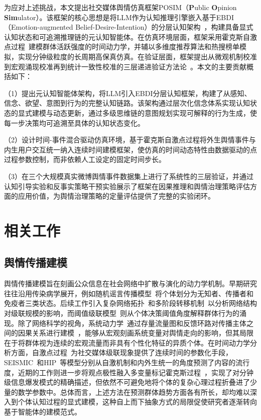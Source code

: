 \documentclass[lettersize,journal]{IEEEtran}
\begin{document}
为应对上述挑战，本文提出社交媒体舆情仿真框架POSIM（\textbf{P}ublic \textbf{O}pinion \textbf{Sim}ulator）。该框架的核心思想是将LLM作为认知推理引擎嵌入基于EBDI（Emotion-augmented Belief-Desire-Intention）的分层认知架构~\cite{bratman_intention_1987,rao_bdi_1995}，构建具备显式认知状态和可追溯推理链的元认知智能体。在仿真环境层面，框架采用霍克斯自激点过程~\cite{hawkes_spectra_1971}建模群体活跃强度的时间动力学，并辅以多维度推荐算法和热搜榜单模拟，实现分钟级粒度的长周期高保真仿真。在验证层面，框架提出从微观机制校准到宏观涌现校准再到统计一致性校准的三层递进验证方法论~\cite{sargent_verification_2013}。本文的主要贡献概括如下：

（1）提出元认知智能体架构，将LLM引入EBDI分层认知框架，构建了从感知、信念、欲望、意图到行为的完整认知链路。该架构通过层次化信念体系实现认知状态的显式建模与动态更新，通过多级思维链的意图规划实现可解释的行为生成，使每一步决策均可追溯至具体的认知状态变化。

（2）设计时间-事件混合驱动仿真环境，基于霍克斯自激点过程将外生舆情事件与内生用户交互统一纳入连续时间建模框架，使仿真的时间动态特性由数据驱动的点过程参数控制，而非依赖人工设定的固定时间步长。

（3）在三个大规模真实微博舆情事件数据集上进行了系统性的三层验证，并通过认知引导实验和反事实策略干预实验展示了框架在因果推理和舆情治理策略评估方面的应用价值，为舆情治理策略的定量评估提供了完整的实验闭环。


\section{相关工作}
\label{sec:related}

\subsection{舆情传播建模}

舆情传播建模旨在刻画公众信息在社会网络中扩散与演化的动力学机制。早期研究往往沿用传染病学展开，例如随机谣言传播模型~\cite{daley_stochastic_1965}将个体划分为无知者、传播者和免疫者三类状态。后续工作引入复杂网络拓扑~\cite{watts_strogatz_1998,barabasi_albert_1999}和多阶段转移机制~\cite{jiang_weibo_spnr_2020}以分析网络结构对级联规模的影响，而阈值级联模型~\cite{granovetter_threshold_1978,watts_cascades_2002}则从个体决策阈值角度解释群体行为的涌现。除了网络科学的视角，系统动力学~\cite{forrester_industrial_1961,sterman_business_2000}通过存量流量图和反馈环路对传播主体之间的因果关系进行建模~\cite{gao_sd_public_opinion_2019,liu_evolution_2024}，能够从宏观刻画系统变量对舆情走向的影响，但其局限在于将群体视为连续的宏观流量而非具有个性化特征的异质个体。在时间动力学分析方面，自激点过程~\cite{hawkes_spectra_1971}为社交媒体级联现象提供了连续时间的参数化手段，SEISMIC~\cite{zhao_seismic_2015}和HIP~\cite{rizoiu_expecting_2017}等模型分别从自激机制和内外生统一的角度预测了内容的流行度，近期的工作则进一步将观点极性融入多变量标记霍克斯过程~\cite{zhang_opinion-aware_2023}，实现了对分钟级信息爆发模式的精确描述，但依然不可避免地将个体的复杂心理过程折叠进了少量的数学参数中。总体而言，上述方法在预测群体趋势方面各有所长，却均难以深入到个体认知过程的显式建模，这种自上而下抽象方式的局限促使研究者逐渐转向基于智能体的建模范式。
\end{document}
